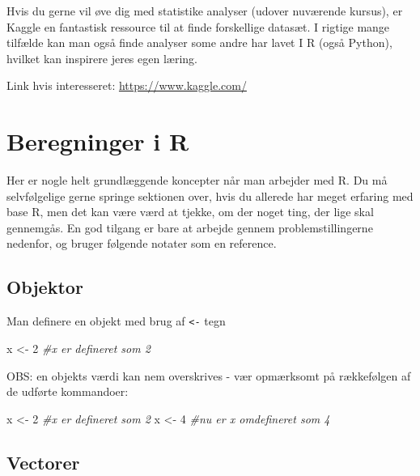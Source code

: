 \documentclass[
]{book}
\newenvironment{Shaded}{\begin{snugshade}}{\end{snugshade}}
\newcommand{\CommentTok}[1]{\textcolor[rgb]{0.37,0.37,0.37}{\textit{#1}}}
\newcommand{\DecValTok}[1]{\textcolor[rgb]{0.06,0.06,0.06}{#1}}
\newcommand{\NormalTok}[1]{#1}
\newcommand{\OtherTok}[1]{\textcolor[rgb]{0.37,0.37,0.37}{#1}}
\begin{document}
Hvis du gerne vil øve dig med statistike analyser (udover nuværende kursus), er Kaggle en fantastisk ressource til at finde forskellige datasæt. I rigtige mange tilfælde kan man også finde analyser some andre har lavet I R (også Python), hvilket kan inspirere jeres egen læring.

Link hvis interesseret: \url{https://www.kaggle.com/}

\section{Beregninger i R}\label{beregninger-i-r}

Her er nogle helt grundlæggende koncepter når man arbejder med R. Du må selvfølgelige gerne springe sektionen over, hvis du allerede har meget erfaring med base R, men det kan være værd at tjekke, om der noget ting, der lige skal gennemgås. En god tilgang er bare at arbejde gennem problemstillingerne nedenfor, og bruger følgende notater som en reference.

\subsection{Objektor}\label{objektor}

Man definere en objekt med brug af \texttt{\textless{}-} tegn

\begin{Shaded}
\begin{Highlighting}[]
\NormalTok{x }\OtherTok{\textless{}{-}} \DecValTok{2} \CommentTok{\#x er defineret som 2}
\end{Highlighting}
\end{Shaded}

OBS: en objekts værdi kan nem overskrives - vær opmærksomt på rækkefølgen af de udførte kommandoer:

\begin{Shaded}
\begin{Highlighting}[]
\NormalTok{x }\OtherTok{\textless{}{-}} \DecValTok{2} \CommentTok{\#x er defineret som 2}
\NormalTok{x }\OtherTok{\textless{}{-}} \DecValTok{4} \CommentTok{\#nu er x omdefineret som 4}
\end{Highlighting}
\end{Shaded}

\subsection{Vectorer}\label{vectorer}
\end{document}
